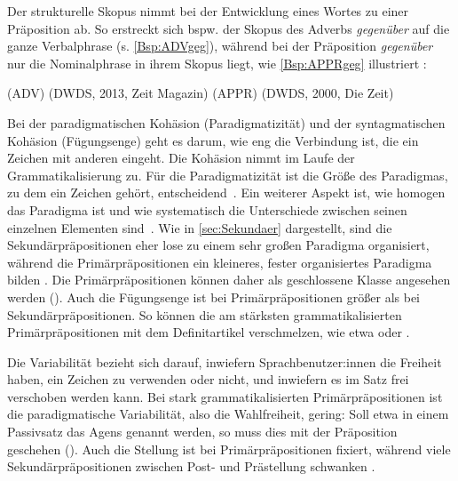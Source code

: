 Der strukturelle Skopus nimmt bei der Entwicklung eines Wortes zu einer Pr{\"a}position ab. 
So erstreckt sich bspw. der Skopus des Adverbs \textit{gegenüber }auf die ganze Verbalphrase (s. \autoref{Bsp:ADVgeg}), w{\"a}hrend bei der Pr{\"a}position \textit{gegenüber }nur die Nominalphrase in ihrem Skopus liegt, wie \autoref{Bsp:APPRgeg} illustriert \citep[s.][301]{Braunmueller1985}:
\begin{exe}
\ex {} (ADV)  (DWDS, 2013, Zeit Magazin) \label{Bsp:ADVgeg}
\ex {} (APPR)  (DWDS, 2000, Die Zeit) \label{Bsp:APPRgeg}
\end{exe}
Bei der paradigmatischen Kohäsion (Paradigmatizität) und der syntagmatischen Kohäsion (Fügungsenge) geht es darum, wie eng die Verbindung ist, die ein Zeichen mit anderen eingeht. 
Die Kohäsion nimmt im Laufe der Grammatikalisierung zu. 
F{\"u}r die Paradigmatizit{\"a}t ist die Gr{\"o}{\ss}e des Paradigmas, zu dem ein Zeichen geh{\"o}rt, entscheidend~\citep[141]{Lehmann.1995}. 
Ein weiterer Aspekt ist, wie homogen das Paradigma ist und wie systematisch die Unterschiede zwischen seinen einzelnen Elementen sind~\citep[143]{Lehmann.1995}. 
Wie in \autoref{sec:Sekundaer} dargestellt, sind die Sekundärpräpositionen eher lose zu einem sehr großen Paradigma organisiert, während die Primärpräpositionen ein kleineres, fester organisiertes Paradigma bilden \citep[s.][68]{Diewald.1997}. 
Die Primärpräpositionen können daher als geschlossene Klasse angesehen werden (\cites[s.][66]{Diewald.1997}[94]{Szczepaniak2011}[353]{Helbig.2017}).
Auch die Fügungsenge ist bei Primärpräpositionen größer als bei Sekundärpräpositionen. 
So können die am stärksten grammatikalisierten Primärpräpositionen mit dem Definitartikel verschmelzen, wie etwa  oder  \citep[s.][]{Nubling2005}.

Die Variabilität bezieht sich darauf, inwiefern Sprachbenutzer:innen die Freiheit haben, ein Zeichen zu verwenden oder nicht, und inwiefern es im Satz frei verschoben werden kann. 
Bei stark grammatikalisierten Primärpräpositionen ist die paradigmatische Variabilität, also die Wahlfreiheit, gering: Soll etwa in einem Passivsatz das Agens genannt werden, so muss dies mit der Präposition  geschehen (). 
Auch die Stellung ist bei Primärpräpositionen fixiert, während viele Sekundärpräpositionen zwischen Post- und Prästellung schwanken \citep[s.][29]{DiMeola2000}. 

